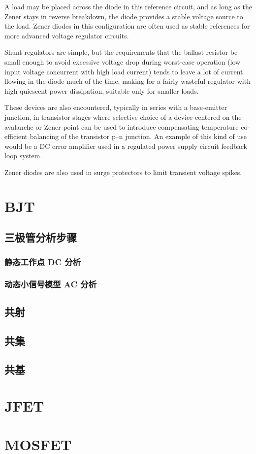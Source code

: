 A load may be placed across the diode in this reference circuit, and as long as the Zener stays in reverse breakdown, the diode provides a stable voltage source to the load. Zener diodes in this configuration are often used as stable references for more advanced voltage regulator circuits.

Shunt regulators are simple, but the requirements that the ballast resistor be small enough to avoid excessive voltage drop during worst-case operation (low input voltage concurrent with high load current) tends to leave a lot of current flowing in the diode much of the time, making for a fairly wasteful regulator with high quiescent power dissipation, suitable only for smaller loads.

These devices are also encountered, typically in series with a base-emitter junction, in transistor stages where selective choice of a device centered on the avalanche or Zener point can be used to introduce compensating temperature co-efficient balancing of the transistor p–n junction. An example of this kind of use would be a DC error amplifier used in a regulated power supply circuit feedback loop system.

Zener diodes are also used in surge protectors to limit transient voltage spikes.

\section{BJT}

\subsection{三极管分析步骤}

\subsubsection{静态工作点 DC 分析}

\subsubsection{动态小信号模型 AC 分析}

\subsection{共射}

\subsection{共集}

\subsection{共基}

\section{JFET}

\section{MOSFET}

